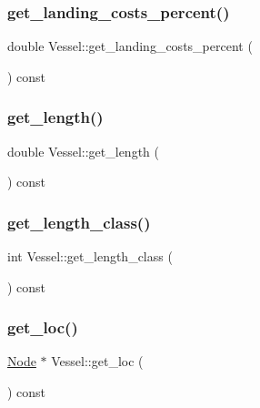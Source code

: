 \mbox{\label{class_vessel_abd14f1cc23affb3e7878434c1161677e}} 
\subsubsection{\texorpdfstring{get\_landing\_costs\_percent()}{get\_landing\_costs\_percent()}}
{\footnotesize\ttfamily double Vessel\+::get\+\_\+landing\+\_\+costs\+\_\+percent (\begin{DoxyParamCaption}{ }\end{DoxyParamCaption}) const}

\mbox{\label{class_vessel_a069a144cd5dd8a8265e66df212c51eef}} 
\subsubsection{\texorpdfstring{get\_length()}{get\_length()}}
{\footnotesize\ttfamily double Vessel\+::get\+\_\+length (\begin{DoxyParamCaption}{ }\end{DoxyParamCaption}) const}

\mbox{\label{class_vessel_a859fc73647ce8d1f5ee7869423dbf9d0}} 
\subsubsection{\texorpdfstring{get\_length\_class()}{get\_length\_class()}}
{\footnotesize\ttfamily int Vessel\+::get\+\_\+length\+\_\+class (\begin{DoxyParamCaption}{ }\end{DoxyParamCaption}) const}

\mbox{\label{class_vessel_a82ae3f030aaf6d3f7a3a8142e1bbf636}} 
\subsubsection{\texorpdfstring{get\_loc()}{get\_loc()}}
{\footnotesize\ttfamily \mbox{\hyperlink{class_node}{Node}} $\ast$ Vessel\+::get\+\_\+loc (\begin{DoxyParamCaption}{ }\end{DoxyParamCaption}) const}

